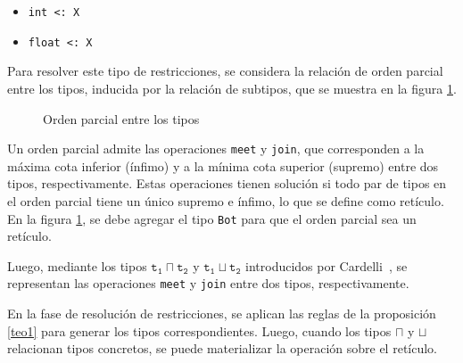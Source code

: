 \begin{itemize}
  \item \texttt{int <: X}
  \item \texttt{float <: X}
\end{itemize}


Para resolver este tipo de restricciones, se considera la relación de orden parcial entre los tipos, inducida por la relación de subtipos, que se muestra en la figura \ref{subt1}.

\begin{figure}[ht]
  \centering
  \caption{Orden parcial entre los tipos}
  \label{subt1}
\end{figure}

Un orden parcial admite las operaciones \texttt{meet} y \texttt{join}, que corresponden a la máxima cota inferior (ínfimo) y a la mínima cota superior (supremo) entre dos tipos, respectivamente. Estas operaciones tienen solución si todo par de tipos en el orden parcial tiene un único supremo e ínfimo, lo que se define como retículo. En la figura \ref{subt1}, se debe agregar el tipo \texttt{Bot} para que el orden parcial sea un retículo.

Luego, mediante los tipos $\mathtt{t_1 \sqcap t_2}$ y $\mathtt{t_1 \sqcup t_2}$ introducidos por Cardelli~\cite{cardelli}, se representan las operaciones \texttt{meet} y \texttt{join} entre dos tipos, respectivamente.

En la fase de resolución de restricciones, se aplican las reglas de la proposición \ref{teo1} para generar los tipos correspondientes. Luego, cuando los tipos $\sqcap$ y $\sqcup$ relacionan tipos concretos, se puede materializar la operación sobre el retículo.



